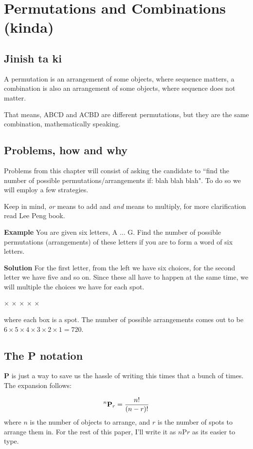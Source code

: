 \documentclass{article}
\begin{document}
\section*{Permutations and Combinations (kinda)}
\subsection*{Jinish ta ki}
A permutation is an arrangement of some objects, where sequence matters, a combination is also
an arrangement of some objects, where sequence does not matter.

That means, ABCD and ACBD are different permutations, but they are the same combination, 
mathematically speaking.

\subsection*{Problems, how and why}
Problems from this chapter will consist of asking the candidate to ``find the number of possible
permutations/arrangements if: blah blah blah". To do so we will employ a few strategies.

Keep in mind, \textit{or} means to add and \textit{and} means to multiply, for more clarification
read Lee Peng book.

\textbf{Example}  You are given six letters, A ... G. Find the number of possible permutations 
(arrangements) of these letters if you are to form a word of six letters. 

\textbf{Solution}  For the first letter, from the left we have six choices, for the second letter
we have five and so on. Since these all have to happen at the same time, we will multiple the 
choices we have for each spot.

\begin{center}
	 $\times$  $\times$  $\times$  $\times$  $\times$ 
\end{center}
where each box is a spot. The number of possible arrangements comes out to be $6 \times 5 \times
4 \times 3 \times 2 \times 1 = 720$.

\subsection*{The P notation}
\textbf{P} is just a way to save us the hassle of writing this times that a bunch of times. The
expansion follows:

\[^n\textrm{\textbf{P}}_r = \frac{n!}{(n-r)!}\]
where $n$ is the number of objects to arrange, and $r$ is the number of spots to arrange them
in. For the rest of this paper, I'll write it as $n$P$r$ as its easier to type.
\end{document}
